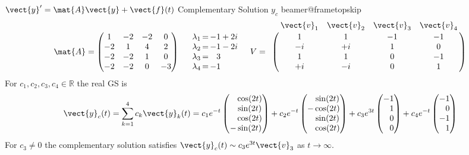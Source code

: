 \begin{frame}[t]{ $\vect{y}'=\mat{A}\vect{y}+\vect{f}(t)$
	\quad Complementary Solution $y_c$}
\csname beamer@frametopskip\endcsname=0pt\relax
\begingroup
\setlength{\abovedisplayskip}{0pt}
\setlength{\abovedisplayshortskip}{0pt}
\setlength{\belowdisplayskip}{2pt}
\setlength{\belowdisplayshortskip}{2pt}
\vspace{-0.25in}
\[
  \mat{A}=\begin{pmatrix}
    1&-2&-2&0\\-2&1&4&2\\-2&-2&1&0\\-2&-2&0&-3
  \end{pmatrix}
  \quad
  \begin{array}{r@{\,=\,}r@{}l}
    \lambda_1&-1&{}+2i\\
    \lambda_2&-1&{}-2i\\
    \lambda_3&\phantom{-}3&\\
    \lambda_4&-1&
  \end{array}
  \quad
  V=\bordermatrix{
    &\vect{v}_1&\vect{v}_2&\vect{v}_3&\vect{v}_4\cr
    &1&1&-1&-1\cr
    &-i&+i&1&0\cr
    &1&1&0&-1\cr
    &+i&-i&0&1\cr
  }
\]
\endgroup
For $c_1,c_2,c_3,c_4\in\mathbb{R}$ the real GS is
\[
  \vect{y}_c(t)=\sum_{k=1}^{4}c_k\vect{y}_k(t)
  =c_1e^{-t}\begin{pmatrix}\phantom{-}\cos(2t)\\\phantom{-}\sin(2t)\\\phantom{-}\cos(2t)\\-\sin(2t)\end{pmatrix}
  +c_2e^{-t}\begin{pmatrix}\phantom{-}\sin(2t)\\-\cos(2t)\\\phantom{-}\sin(2t)\\\phantom{-}\cos(2t)\end{pmatrix}
  +c_3e^{3t}\begin{pmatrix}-1\\\phantom{-}1\\\phantom{-}0\\\phantom{-}0\end{pmatrix}
  +c_4e^{-t}\begin{pmatrix}-1\\\phantom{-}0\\-1\\\phantom{-}1\end{pmatrix}
\]
For $c_3\ne0$ the complementary solution satisfies
$\vect{y}_c(t)\sim c_3e^{3t}\vect{v}_3$ as $t\to\infty$.
\end{frame}

